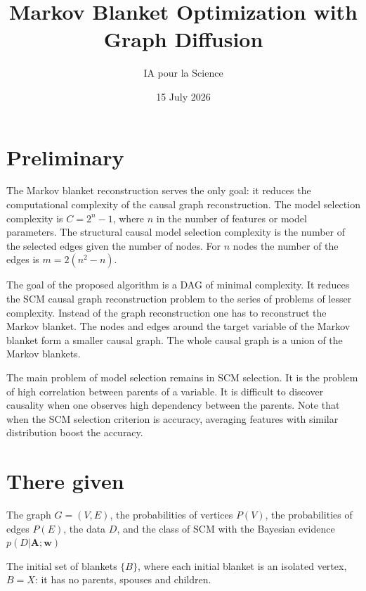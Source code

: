 \documentclass[12pt]{article}
\title{Markov Blanket Optimization with Graph Diffusion}
\author{IA pour la Science}
\date{15 July 2026}
\begin{document}
\maketitle

\section*{Preliminary}
The Markov blanket reconstruction serves the only goal: 
it reduces the computational complexity of the causal graph reconstruction. 
The model selection complexity is $C = 2^n-1$, where $n$ in the number of features or model parameters. 
The structural causal model selection complexity is the number of the selected edges given the number of nodes. 
For $n$ nodes the number of the edges is $m = 2(n^2-n)$.  

\medskip
The goal of the proposed algorithm is a DAG of minimal complexity.
It reduces the SCM causal graph reconstruction problem to the series of problems of lesser complexity.
Instead of the graph reconstruction one has to reconstruct the Markov blanket.
The nodes and edges around the target variable of the Markov blanket form a smaller causal graph.
The whole causal graph is a union of the Markov blankets. 

\medskip
The main problem of model selection remains in SCM selection. 
It is the problem of high correlation between parents of a variable. 
It is difficult to discover causality when one observes high dependency between the parents.
Note that when the  SCM selection criterion is accuracy, 
averaging features with similar distribution boost the accuracy. 

\clearpage
\section*{There given}
The graph $G=(V,E)$, the probabilities of vertices $P(V)$, the probabilities of edges $P(E)$, the data $D$, and the class of SCM with the Bayesian evidence $p(D|\mathbf{A};\mathbf{w})$

\medskip
The initial set of blankets $\{B\}$, where each initial blanket is an isolated vertex, $B=X$:
it has no parents, spouses and children. 
\end{document}
